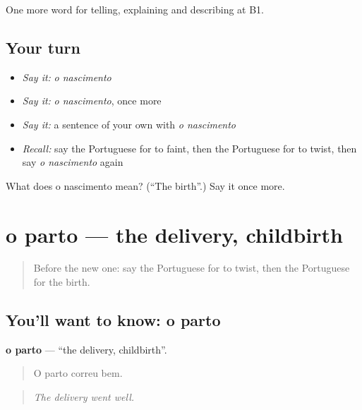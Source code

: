 \begin{grammarlens}[title={What you've built}]
One more word for telling, explaining and describing at B1.
\end{grammarlens}

\subsection*{Your turn}
\begin{itemize}
\raggedright
  \item \emph{Say it:} \emph{o nascimento}
  \item \emph{Say it:} \emph{o nascimento}, once more
  \item \emph{Say it:} a sentence of your own with \emph{o nascimento}
  \item \emph{Recall:} say the Portuguese for to faint, then the Portuguese for to twist, then say \emph{o nascimento} again
\end{itemize}

\begin{tcolorbox}[breakable,colback=teal!4,colframe=teal!35!black,title={Before you move on}]
What does o nascimento mean? (\textquotedblleft{}The birth\textquotedblright{}.) Say it once more.
\end{tcolorbox}
\section[o parto]{o parto — the delivery, childbirth}

\label{lesson:PT-C309-parto}



\begin{quote}
Before the new one: say the Portuguese for to twist, then the Portuguese for the birth.
\end{quote}

\subsection*{You'll want to know: o parto}
\textbf{o parto} — \textquotedblleft{}the delivery, childbirth\textquotedblright{}.

\begin{quote}
O parto correu bem.
\end{quote}

\begin{quote}
\emph{The delivery went well.}
\end{quote}


